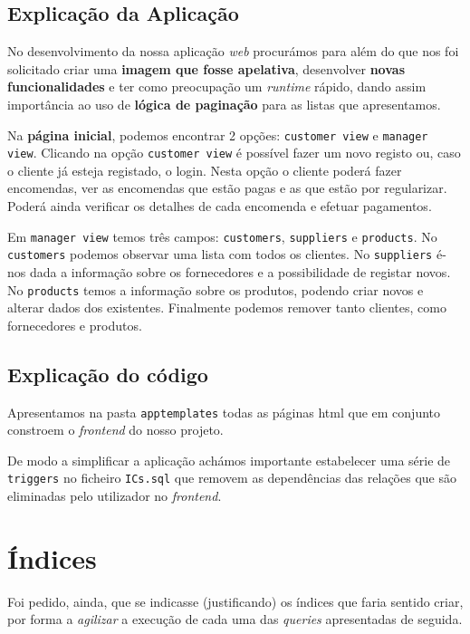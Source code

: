 \documentclass[12pt,a4paper]{article}
\begin{document}
\subsection*{Explicação da Aplicação}

No desenvolvimento da nossa aplicação \textit{web} procurámos para além do que nos foi solicitado criar uma \textbf{imagem que fosse apelativa}, desenvolver
\textbf{novas funcionalidades} e ter como preocupação um \textit{runtime} rápido, dando assim importância ao uso de \textbf{lógica de paginação} para as listas que apresentamos.

Na \textbf{página inicial}, podemos encontrar 2 opções: \texttt{customer view} e \texttt{manager view}.
Clicando na opção \texttt{customer view} é possível fazer um novo registo ou, caso o cliente já esteja registado, o login.
Nesta opção o cliente poderá fazer encomendas, ver as encomendas que estão pagas e as que estão por regularizar.
Poderá ainda verificar os detalhes de cada encomenda e efetuar pagamentos.

Em \texttt{manager view} temos três campos: \texttt{customers}, \texttt{suppliers} e \texttt{products}.
No \texttt{customers} podemos observar uma lista com todos os clientes.
No \texttt{suppliers} é-nos dada a informação sobre os fornecedores e a possibilidade de registar novos.
No \texttt{products} temos a informação sobre os produtos, podendo criar novos e alterar dados dos existentes.
Finalmente podemos remover tanto clientes, como fornecedores e produtos.

\subsection*{Explicação do código}

Apresentamos na pasta \texttt{app\/templates} todas as páginas html que em conjunto constroem o \textit{frontend}
do nosso projeto.

De modo a simplificar a aplicação achámos importante estabelecer uma série de \texttt{triggers} no ficheiro \texttt{ICs.sql}
que removem as dependências das relações que são eliminadas pelo utilizador no \textit{frontend}.

\section*{Índices}

Foi pedido, ainda, que se indicasse (justificando) os índices que faria sentido
criar, por forma a \textit{agilizar} a execução de cada uma das \textit{queries}
apresentadas de seguida.
\end{document}
